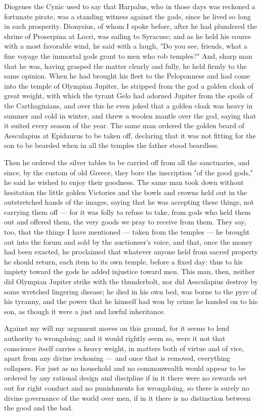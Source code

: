  Diogenes the Cynic used to say that Harpalus, who in those days was reckoned a fortunate pirate, was a standing witness against the gods, since he lived so long in such prosperity. Dionysius, of whom I spoke before, after he had plundered the shrine of Proserpina at Locri, was sailing to Syracuse; and as he held his course with a most favorable wind, he said with a laugh, "Do you see, friends, what a fine voyage the immortal gods grant to men who rob temples?" And, sharp man that he was, having grasped the matter clearly and fully, he held firmly to the same opinion. When he had brought his fleet to the Peloponnese and had come into the temple of Olympian Jupiter, he stripped from the god a golden cloak of great weight, with which the tyrant Gelo had adorned Jupiter from the spoils of the Carthaginians, and over this he even joked that a golden cloak was heavy in summer and cold in winter, and threw a woolen mantle over the god, saying that it suited every season of the year. The same man ordered the golden beard of Aesculapius at Epidaurus to be taken off, declaring that it was not fitting for the son to be bearded when in all the temples the father stood beardless.

 Then he ordered the silver tables to be carried off from all the sanctuaries, and since, by the custom of old Greece, they bore the inscription "of the good gods," he said he wished to enjoy their goodness. The same man took down without hesitation the little golden Victories and the bowls and crowns held out in the outstretched hands of the images, saying that he was accepting these things, not carrying them off — for it was folly to refuse to take, from gods who held them out and offered them, the very goods we pray to receive from them. They say, too, that the things I have mentioned — taken from the temples — he brought out into the forum and sold by the auctioneer's voice, and that, once the money had been exacted, he proclaimed that whatever anyone held from sacred property he should return, each item to its own temple, before a fixed day: thus to his impiety toward the gods he added injustice toward men. This man, then, neither did Olympian Jupiter strike with the thunderbolt, nor did Aesculapius destroy by some wretched lingering disease; he died in his own bed, was borne to the pyre of his tyranny, and the power that he himself had won by crime he handed on to his son, as though it were a just and lawful inheritance.

 Against my will my argument moves on this ground, for it seems to lend authority to wrongdoing; and it would rightly seem so, were it not that conscience itself carries a heavy weight, in matters both of virtue and of vice, apart from any divine reckoning — and once that is removed, everything collapses. For just as no household and no commonwealth would appear to be ordered by any rational design and discipline if in it there were no rewards set out for right conduct and no punishments for wrongdoing, so there is surely no divine governance of the world over men, if in it there is no distinction between the good and the bad.

